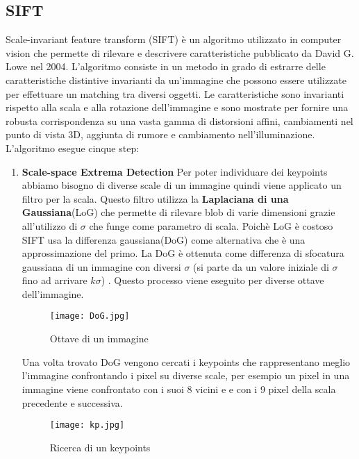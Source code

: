 \subsection{SIFT}
Scale-invariant feature transform (SIFT) è un algoritmo utilizzato in computer vision che permette di rilevare e descrivere caratteristiche pubblicato da David G. Lowe\cite{lowe04} nel 2004. L'algoritmo consiste in un metodo in grado di estrarre delle caratteristiche distintive invarianti da un'immagine che possono essere utilizzate per effettuare un matching tra diversi oggetti. Le caratteristiche sono invarianti rispetto alla scala e alla rotazione dell'immagine e sono mostrate per fornire una robusta corrispondenza su una vasta gamma di distorsioni affini, cambiamenti nel punto di vista 3D, aggiunta di rumore e cambiamento nell'illuminazione. L'algoritmo esegue cinque step:
\begin{enumerate}
	\item \textbf{Scale-space Extrema Detection}
	      Per poter individuare dei keypoints abbiamo bisogno di diverse scale di un immagine quindi viene applicato un filtro per la scala. Questo filtro utilizza la \textbf{Laplaciana di una Gaussiana}(LoG) che permette di rilevare blob di varie dimensioni grazie all'utilizzo di $\sigma$ che funge come parametro di scala. Poichè LoG è costoso SIFT usa la differenza gaussiana(DoG) come alternativa che è una approssimazione del primo. La DoG è ottenuta come differenza di sfocatura gaussiana di un immagine con diversi $\sigma$ (si parte da un valore iniziale di $\sigma$ fino ad arrivare $k\sigma$) . Questo processo viene eseguito per diverse ottave dell'immagine.
	      \begin{figure}[ht]
		      \begin{center}
			      \texttt{[image: DoG.jpg]}
			      \caption{Ottave di un immagine}
			      \label{fig:DoG}
		      \end{center}
	      \end{figure}
	      Una volta trovato DoG vengono cercati i keypoints che rappresentano meglio l'immagine confrontando i pixel su diverse scale, per esempio un pixel in una immagine viene confrontato con i suoi 8 vicini e e con i 9 pixel della scala precedente e successiva.
	      \begin{figure}[ht]
		      \begin{center}
			      \texttt{[image: kp.jpg]}
			      \caption{Ricerca di un keypoints}
			      \label{fig:kp}
		      \end{center}

\end{figure}
\end{enumerate}
